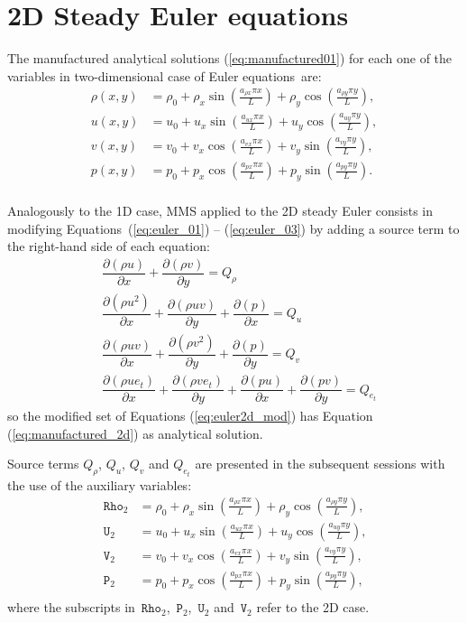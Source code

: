 \documentclass[10pt]{article}
\newcommand{\Diff}[2] {\dfrac{\partial( #1)}{\partial #2}}
\newcommand{\Rho}{\,\mathtt{Rho}}
\newcommand{\PP}{\,\mathtt{P}}
\newcommand{\U}{\,\mathtt{U}}
\newcommand{\V}{\,\mathtt{V}}
\begin{document}
 \section{2D Steady Euler equations}
The manufactured analytical solutions (\ref{eq:manufactured01}) for each one of the variables in two-dimensional case of Euler equations~are:
\begin{equation}
\begin{split}
\label{eq:manufactured_2d}
\rho\left(x,y\right) &=  \rho_{0}+ \rho_{x} \sin\left(\frac{a_{ \rho x} \pi x}{L}\right)+ \rho_{y} \cos\left(\frac{a_{ \rho y} \pi y}{L}\right),\\
u\left(x,y\right) &= u_{0}+u_{x} \sin\left(\frac{a_{u x} \pi x}{L}\right)+u_{y} \cos\left(\frac{a_{u y} \pi y}{L}\right),\\
v\left(x,y\right) &= v_{0}+v_{x} \cos\left(\frac{a_{v x} \pi x}{L}\right)+v_{y} \sin\left(\frac{a_{v y} \pi y}{L}\right),\\
p\left(x,y\right) &= p_{0}+p_{x} \cos\left(\frac{a_{p x} \pi x}{L}\right)+p_{y} \sin\left(\frac{a_{p y} \pi y}{L}\right).\\
\end{split}
\end{equation}


Analogously to the 1D case, MMS applied to the 2D steady Euler consists in modifying Equations~(\ref{eq:euler_01}) -- (\ref{eq:euler_03}) by adding a source term to the right-hand side of each equation:
\begin{equation}
\begin{split}
\label{eq:euler2d_mod}
& \Diff{\rho u}{x}+\Diff{\rho v}{y} = Q_\rho\\
& \Diff{\rho u^2 }{x}+\Diff{\rho uv}{y} +\Diff{p}{x}= Q_u\\
& \Diff{\rho uv}{x}+\Diff{\rho v^2}{y} +\Diff{p}{y}= Q_v\\
& \Diff{\rho ue_t }{x}+\Diff{\rho ve_t}{y}+\Diff{pu}{x} +\Diff{pv}{y}= Q_{e_t}
\end{split}
\end{equation}
so the modified set of Equations (\ref{eq:euler2d_mod}) has Equation (\ref{eq:manufactured_2d}) as analytical solution.

Source terms $Q_\rho$, $Q_u$, $Q_v$ and $Q_{e_t}$ are presented in the subsequent sessions with the use of the auxiliary variables:
\begin{equation*}
 \begin{split}
\label{eq:aux_2d}
\Rho_2 &= \rho_{0}+ \rho_{x} \sin\left(\frac{a_{ \rho x} \pi x}{L}\right)+ \rho_{y} \cos\left(\frac{a_{ \rho y} \pi y}{L}\right),\\
\U_2 &= u_{0}+u_{x} \sin\left(\frac{a_{u x} \pi x}{L}\right)+u_{y} \cos\left(\frac{a_{u y} \pi y}{L}\right),\\
\V_2 &= v_{0}+v_{x} \cos\left(\frac{a_{v x} \pi x}{L}\right)+v_{y} \sin\left(\frac{a_{v y} \pi y}{L}\right),\\
\PP_2 &= p_{0}+p_{x} \cos\left(\frac{a_{p x} \pi x}{L}\right)+p_{y} \sin\left(\frac{a_{p y} \pi y}{L}\right),\\
\end{split}
\end{equation*}
%
where the subscripts in $\Rho_2$, $\PP_2$, $\U_2$ and $\V_2$ refer to the 2D case.
\end{document}
